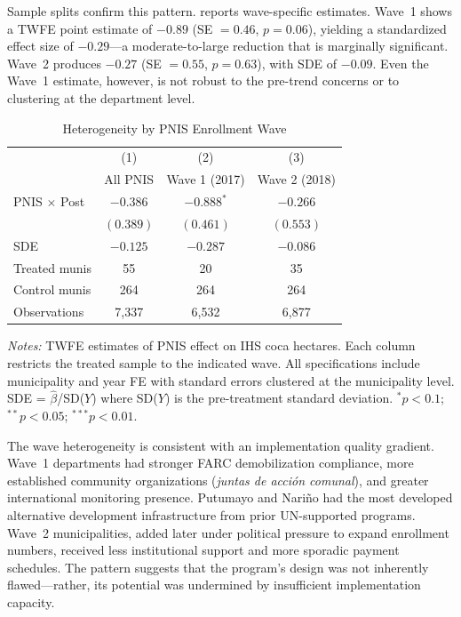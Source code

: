 \documentclass[12pt]{article}
\begin{document}
Sample splits confirm this pattern.  reports wave-specific estimates. Wave~1 shows a TWFE point estimate of $-0.89$ (SE $= 0.46$, $p = 0.06$), yielding a standardized effect size of $-0.29$---a moderate-to-large reduction that is marginally significant. Wave~2 produces $-0.27$ (SE $= 0.55$, $p = 0.63$), with SDE of $-0.09$. Even the Wave~1 estimate, however, is not robust to the pre-trend concerns or to clustering at the department level.

\begin{table}[H]
\centering
\caption{Heterogeneity by PNIS Enrollment Wave}
\label{tab:waves}
\begin{tabular}{lccc}
\toprule
 & (1) & (2) & (3) \\
 & All PNIS & Wave 1 (2017) & Wave 2 (2018) \\
\midrule
PNIS $\times$ Post & $-0.386$ & $-0.888^{*}$ & $-0.266$ \\
 & $(0.389)$ & $(0.461)$ & $(0.553)$ \\[4pt]
SDE & $-0.125$ & $-0.287$ & $-0.086$ \\
Treated munis & 55 & 20 & 35 \\
Control munis & 264 & 264 & 264 \\
Observations & 7,337 & 6,532 & 6,877 \\
\bottomrule
\end{tabular}
\begin{tablenotes}[flushleft]\small
\item \textit{Notes:} TWFE estimates of PNIS effect on IHS coca hectares. Each column restricts the treated sample to the indicated wave. All specifications include municipality and year FE with standard errors clustered at the municipality level. SDE = $\hat{\beta}$/SD($Y$) where SD($Y$) is the pre-treatment standard deviation. $^{*}p<0.1$; $^{**}p<0.05$; $^{***}p<0.01$.
\end{tablenotes}
\end{table}

The wave heterogeneity is consistent with an implementation quality gradient. Wave~1 departments had stronger FARC demobilization compliance, more established community organizations (\emph{juntas de acci\'{o}n comunal}), and greater international monitoring presence. Putumayo and Nari\~{n}o had the most developed alternative development infrastructure from prior UN-supported programs. Wave~2 municipalities, added later under political pressure to expand enrollment numbers, received less institutional support and more sporadic payment schedules. The pattern suggests that the program's design was not inherently flawed---rather, its potential was undermined by insufficient implementation capacity.
\end{document}
